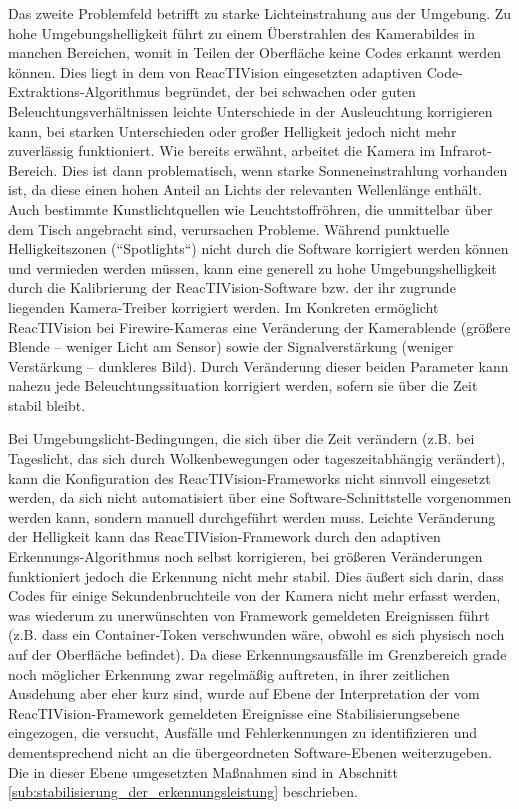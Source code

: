 Das zweite Problemfeld betrifft zu starke Lichteinstrahung aus der Umgebung. Zu hohe Umgebungshelligkeit führt zu einem Überstrahlen des Kamerabildes in manchen Bereichen, womit in Teilen der Oberfläche keine Codes erkannt werden können. Dies liegt in dem von ReacTIVision eingesetzten adaptiven Code-Extraktions-Algorithmus begründet, der bei schwachen oder guten Beleuchtungsverhältnissen leichte Unterschiede in der Ausleuchtung korrigieren kann, bei starken Unterschieden oder großer Helligkeit jedoch nicht mehr zuverlässig funktioniert. Wie bereits erwähnt, arbeitet die Kamera im Infrarot-Bereich. Dies ist dann problematisch, wenn starke Sonneneinstrahlung vorhanden ist, da diese einen hohen Anteil an Lichts der relevanten Wellenlänge enthält. Auch bestimmte Kunstlichtquellen wie Leuchtstoffröhren, die unmittelbar über dem Tisch angebracht sind, verursachen Probleme. Während punktuelle Helligkeitszonen (“Spotlights“) nicht durch die Software korrigiert werden können und vermieden werden müssen, kann eine generell zu hohe Umgebungshelligkeit durch die Kalibrierung der ReacTIVision-Software bzw. der ihr zugrunde liegenden Kamera-Treiber korrigiert werden. Im Konkreten ermöglicht ReacTIVision bei Firewire-Kameras eine Veränderung der Kamerablende (größere Blende -- weniger Licht am Sensor) sowie der Signalverstärkung (weniger Verstärkung -- dunkleres Bild). Durch Veränderung dieser beiden Parameter kann nahezu jede Beleuchtungssituation korrigiert werden, sofern sie über die Zeit stabil bleibt.

Bei Umgebungslicht-Bedingungen, die sich über die Zeit verändern (z.B. bei Tageslicht, das sich durch Wolkenbewegungen oder tageszeitabhängig verändert), kann die Konfiguration des ReacTIVision-Frameworks nicht sinnvoll eingesetzt werden, da sich nicht automatisiert über eine Software-Schnittstelle vorgenommen werden kann, sondern manuell durchgeführt werden muss. Leichte Veränderung der Helligkeit kann das ReacTIVision-Framework durch den adaptiven Erkennungs-Algorithmus noch selbst korrigieren, bei größeren Veränderungen funktioniert jedoch die Erkennung nicht mehr stabil. Dies äußert sich darin, dass Codes für einige Sekundenbruchteile von der Kamera nicht mehr erfasst werden, was wiederum zu unerwünschten von Framework gemeldeten Ereignissen führt (z.B. dass ein Container-Token verschwunden wäre, obwohl es sich physisch noch auf der Oberfläche befindet). Da diese Erkennungsausfälle im Grenzbereich grade noch möglicher Erkennung zwar regelmäßig auftreten, in ihrer zeitlichen Ausdehung aber eher kurz sind, wurde auf Ebene der Interpretation der vom ReacTIVision-Framework gemeldeten Ereignisse eine Stabilisierungsebene eingezogen, die versucht, Ausfälle und Fehlerkennungen zu identifizieren und dementsprechend nicht an die übergeordneten Software-Ebenen weiterzugeben. Die in dieser Ebene umgesetzten Maßnahmen sind in Abschnitt \ref{sub:stabilisierung_der_erkennungsleistung} beschrieben.

